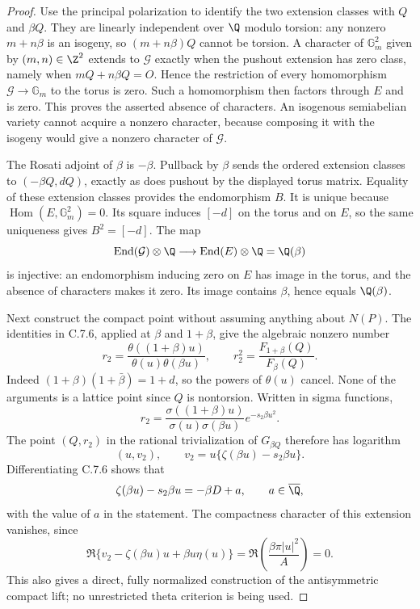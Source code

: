 \begin{proof}
Use the principal polarization to identify the two extension
classes with $Q$ and $\beta Q$. They are linearly independent
over $\Q$ modulo torsion: any nonzero $m+n\beta$ is an
isogeny, so $(m+n\beta)Q$ cannot be torsion. A character
of $\mathbb G_m^2$ given by $(m,n)\in\Z^2$ extends to
$\mathcal G$ exactly when the pushout extension has zero
class, namely when $mQ+n\beta Q=O$. Hence the restriction
of every homomorphism $\mathcal G\to\mathbb G_m$ to
the torus is zero. Such a homomorphism then factors through
$E$ and is zero. This proves the asserted absence of
characters. An isogenous semiabelian variety cannot acquire
a nonzero character, because composing it with the isogeny
would give a nonzero character of $\mathcal G$.

The Rosati adjoint of $\beta$ is $-\beta$. Pullback by
$\beta$ sends the ordered extension classes to
$(-\beta Q,dQ)$, exactly as does pushout by the displayed
torus matrix. Equality of these extension classes provides
the endomorphism $B$. It is unique because
$\operatorname{Hom}(E,\mathbb G_m^2)=0$. Its square
induces $[-d]$ on the torus and on $E$, so the same
uniqueness gives $B^2=[-d]$. The map
\[
 \operatorname{End}(\mathcal G)\otimes\Q
     \longrightarrow\operatorname{End}(E)\otimes\Q
          =\Q(\beta)
\]
is injective: an endomorphism inducing zero on $E$ has image
in the torus, and the absence of characters makes it zero.
Its image contains $\beta$, hence equals $\Q(\beta)$.

Next construct the compact point without assuming anything
about $N(P)$. The identities in C.7.6, applied at $\beta$
and $1+\beta$, give the algebraic nonzero number
\begin{equation}\label{ari:eq:ce-ribet-r}
 r_2=\frac{\theta((1+\beta)u)}{\theta(u)\theta(\beta u)},
 \qquad r_2^2=\frac{F_{1+\beta}(Q)}{F_\beta(Q)}.
\end{equation}
Indeed $(1+\beta)(1+\bar\beta)=1+d$, so the powers
of $\theta(u)$ cancel. None of the arguments is a lattice
point since $Q$ is nontorsion. Written in sigma functions,
\[
 r_2=\frac{\sigma((1+\beta)u)}{\sigma(u)\sigma(\beta u)}
                         e^{-s_2\beta u^2}.
\]
The point $(Q,r_2)$ in the rational trivialization of
$G_{\beta Q}$ therefore has logarithm
\[
 (u,v_2),\qquad
 v_2=u\{\zeta(\beta u)-s_2\beta u\}.
\]
Differentiating C.7.6 shows that
\begin{equation}\label{ari:eq:ce-zeta}
 \zeta(\beta u)-s_2\beta u=-\beta D+a,
 \qquad a\in\overline\Q,
\end{equation}
with the value of $a$ in the statement. The compactness
character of this extension vanishes, since
\[
 \Re\{v_2-\zeta(\beta u)u+\beta u\eta(u)\}
    =\Re\left(\frac{\beta\pi|u|^2}{A}\right)=0.
\]
This also gives a direct, fully normalized construction of
the antisymmetric compact lift; no unrestricted theta
criterion is being used.


\end{proof}
